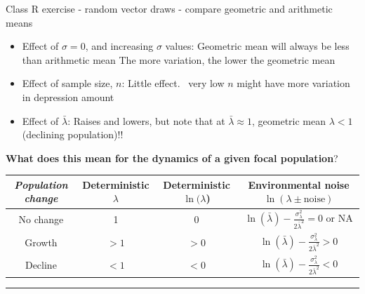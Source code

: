 \documentclass{article}
\newcommand{\note}[1]{\colorbox{gray!20}{#1}}
\begin{document}
\pagebreak

\note{Class R exercise} - random vector draws - compare geometric and arithmetic means 
\begin{itemize}
	\item Effect of $\sigma = 0$, and increasing $\sigma$ values:
		\subitem	Geometric mean will always be less than arithmetic mean 
		\subitem	The more variation, the lower the geometric mean 
	\item	Effect of sample size, $n$:
		 \subitem	Little effect.  very low $n$ might have more variation in depression amount 
	\item	Effect of $\bar{\lambda}$:
		\subitem Raises and lowers, but note that at $\bar{\lambda}\approx 1$, geometric mean $\lambda < 1$  (declining population)!!
\end{itemize}

\textbf{What does this mean for the dynamics of a given focal population}?
\begin{center}
\begin{tabular}{|c|c|c|c|}
\hline \rule[-2ex]{0pt}{5.5ex} \emph{Population change} &  Deterministic $\lambda$ & Deterministic $\ln(\lambda$) &  Environmental noise $\ln(\lambda \pm \text{noise})$\\ 
\hline \rule[-2ex]{0pt}{5.5ex} No change & 1 & 0 & 
$\ln(\bar{\lambda})-\frac{\sigma_\lambda^2}{2\bar{\lambda}^2} = 0 \text{ or NA}$ \\
\hline \rule[-2ex]{0pt}{5.5ex} Growth  & $>1$ & $>0$  & $\ln(\bar{\lambda})-\frac{\sigma_\lambda^2}{2\bar{\lambda}^2} > 0$  \\ 
\hline \rule[-2ex]{0pt}{5.5ex} Decline & $<1$ & $<0$  & $\ln(\bar{\lambda})-\frac{\sigma_\lambda^2}{2\bar{\lambda}^2}<0$  \\ 
\hline 
\end{tabular}
\end{center} 

\rule[0.5ex]{\linewidth}{1pt}
\end{document}
